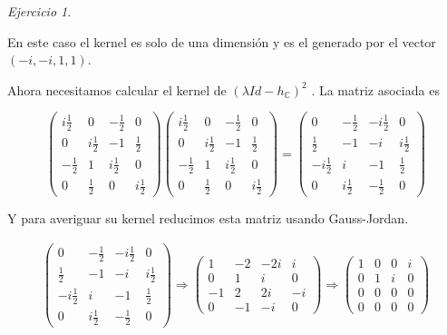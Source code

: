 \documentclass[11pt,a4paper]{article}
\theoremstyle{definition}
\theoremstyle{remark}
\newtheorem{exc}{Ejercicio}
\begin{document}
\begin{exc}
\begin{enumerate}
						En este caso el kernel es solo de una dimensión y es el generado por el vector $ (-i,-i,1,1) $.
						
						Ahora necesitamos calcular el kernel de $ (\lambda Id-h_\mathbb{C})^2 $ . La matriz asociada es
						
		\begin{equation}
			\begin{pmatrix}
		  	i\frac{1}{2} & 0 & -\frac{1}{2} & 0
		  	\\ 0 & i\frac{1}{2} & -1 & \frac{1}{2} 
		  	\\ -\frac{1}{2} & 1 & i\frac{1}{2} & 0
	    	\\ 0 & \frac{1}{2} & 0 & i\frac{1}{2}
	    	\end{pmatrix}
	    	\begin{pmatrix}
	    	i\frac{1}{2} & 0 & -\frac{1}{2} & 0
	    	\\ 0 & i\frac{1}{2} & -1 & \frac{1}{2} 
	    	\\ -\frac{1}{2} & 1 & i\frac{1}{2} & 0
	    	\\ 0 & \frac{1}{2} & 0 & i\frac{1}{2}
	    	\end{pmatrix} =
	    	\begin{pmatrix}
	    	0 & -\frac{1}{2} & -i\frac{1}{2} & 0
	    	\\ \frac{1}{2} & -1 & -i & i\frac{1}{2} 
	    	\\ -i\frac{1}{2} & i & -1 & \frac{1}{2}
	    	\\ 0 & i\frac{1}{2} & -\frac{1}{2} & 0
	    	\end{pmatrix} \nonumber
			\end{equation}
			
			Y para averiguar su kernel reducimos esta matriz usando Gauss-Jordan.
			
			\begin{multline}
			\begin{pmatrix}
	    	0 & -\frac{1}{2} & -i\frac{1}{2} & 0
	    	\\ \frac{1}{2} & -1 & -i & i\frac{1}{2} 
	    	\\ -i\frac{1}{2} & i & -1 & \frac{1}{2}
	    	\\ 0 & i\frac{1}{2} & -\frac{1}{2} & 0
	    	\end{pmatrix} \Rightarrow
			\begin{pmatrix}
	    	 1 & -2 & -2i & i 
	    	\\0 & 1 & i & 0
	    	\\ -1 & 2 & 2i & -i
	    	\\ 0 & -1 & -i & 0
	    	\end{pmatrix} \nonumber \Rightarrow
	    	\begin{pmatrix}
	   	 	1 & 0 & 0 & i 
	    	\\0 & 1 & i & 0
	    	\\ 0 & 0 & 0 & 0
	    	\\ 0 & 0 & 0 & 0
	 	    	\end{pmatrix}
			\end{multline}
			

\end{enumerate}
\end{exc}
\end{document}
